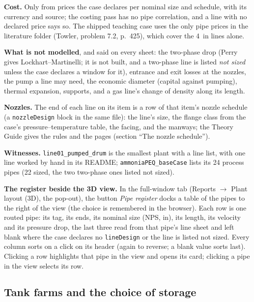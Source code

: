 \documentclass[11pt,a4paper]{article}
\begin{document}
\textbf{Cost.} Only from prices the case declares per nominal size and
schedule, with its currency and source; the costing pass has no pipe
correlation, and a line with no declared price says so. The shipped
teaching case uses the only pipe prices in the literature folder
(Towler, problem 7.2, p.~425), which cover the 4~in lines alone.

\textbf{What is not modelled}, and said on every sheet: the two-phase
drop (Perry gives Lockhart--Martinelli; it is not built, and a two-phase
line is listed \emph{not sized} unless the case declares a window for
it), entrance and exit losses at the nozzles, the pump a line may need,
the economic diameter (capital against pumping), thermal expansion,
supports, and a gas line's change of density along its length.

\textbf{Nozzles.} The end of each line on its item is a row of that
item's nozzle schedule (a \texttt{nozzleDesign} block in the same
file): the line's size, the flange class from the case's
pressure--temperature table, the facing, and the manways; the Theory
Guide gives the rules and the pages (section ``The nozzle schedule'').

\textbf{Witnesses.} \texttt{line01\_pumped\_drum} is the smallest plant
with a line list, with one line worked by hand in its README;
\texttt{ammoniaPEQ\_baseCase} lists its 24 process pipes (22 sized,
the two two-phase ones listed not sized).

\textbf{The register beside the 3D view.} In the full-window tab
(Reports $\rightarrow$ Plant layout (3D), the pop-out), the button
\emph{Pipe register} docks a table of the pipes to the right of the view
(the choice is remembered in the browser). Each row is one routed pipe:
its tag, its ends, its nominal size (NPS, in), its length, its velocity
and its pressure drop, the last three read from that pipe's line sheet
and left blank where the case declares no \texttt{lineDesign} or the
line is listed not sized. Every column sorts on a click on its header
(again to reverse; a blank value sorts last). Clicking a row highlights
that pipe in the view and opens its card; clicking a pipe in the view
selects its row.

\hypertarget{tank-farms-and-the-choice-of-storage}{%
\subsection{Tank farms and the choice of
storage}\label{tank-farms-and-the-choice-of-storage}}
\end{document}
